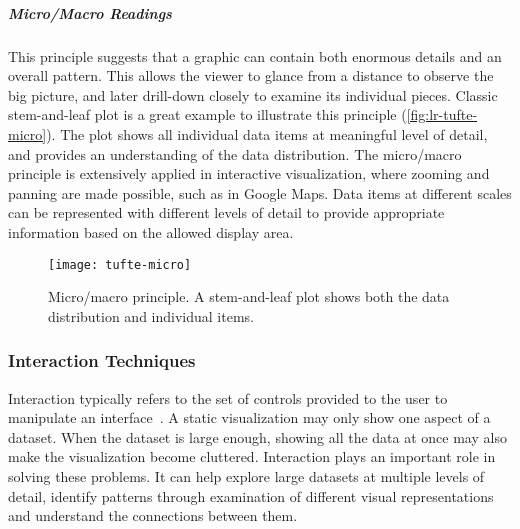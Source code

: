 \subparagraph{Micro/Macro Readings}
This principle suggests that a graphic can contain both enormous details and an overall pattern. This allows the viewer to glance from a distance to observe the big picture, and later drill-down closely to examine its individual pieces. Classic stem-and-leaf plot is a great example to illustrate this principle (\autoref{fig:lr-tufte-micro}). The plot shows all individual data items at meaningful level of detail, and provides an understanding of the data distribution. The micro/macro principle is extensively applied in interactive visualization, where zooming and panning are made possible, such as in Google Maps. Data items at different scales can be represented with different levels of detail to provide appropriate information based on the allowed display area.

\begin{figure}[!htb]
	\centering
	\texttt{[image: tufte-micro]}
	\caption{Micro/macro principle. A stem-and-leaf plot shows both the data distribution and individual items. }
	\label{fig:lr-tufte-micro}
\end{figure}



\subsubsection{Interaction Techniques}
Interaction typically refers to the set of controls provided to the user to manipulate an interface~\cite{Pike2009a}. A static visualization may only show one aspect of a dataset. When the dataset is large enough, showing all the data at once may also make the visualization become cluttered. Interaction plays an important role in solving these problems. It can help explore large datasets at multiple levels of detail, identify patterns through examination of different visual representations and understand the connections between them.

